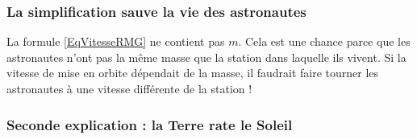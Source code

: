 \subsubsection{La simplification sauve la vie des astronautes}

La formule \eqref{EqVitesseRMG} ne contient pas $m$. Cela est une chance parce que les astronautes n'ont pas la même masse que la station dans laquelle ils vivent. Si la vitesse de mise en orbite dépendait de la masse, il faudrait faire tourner les astronautes à une vitesse différente de la station ! 

\subsubsection{Seconde explication : la Terre \og rate\fg{} le Soleil}




